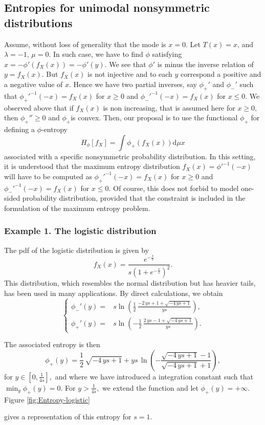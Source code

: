 \documentclass[english,onecolumn]{elsarticle}
\def\dmu{\mathrm{d}\mu}
\begin{document}
\subsection{Entropies for unimodal nonsymmetric distributions}

Assume, without loss of generality that the mode is $x=0.$ Let $T(x)=x$,
and $\lambda=-1$, $\mu=0.$ In such case, we have to find $\phi$
satisfying $x=-\phi'\left(f_{X}(x)\right)=-\phi'(y)$. We see that
$\phi'$ is minus the inverse relation of $y=f_{X}(x)$. But $f_{X}(x)$
is not injective and to each $y$ correspond a positive and a negative
value of $x.$ Hence we have two partial inverses, say $\phi_{+}'$
and $\phi_{-}'$ such that $\phi_{+}'^{-1}(-x)=f_{X}(x)$ for $x\geq0$
and $\phi_{-}'^{-1}(-x)=f_{X}(x)$ for $x\leq0$. We observed above
that if $f_{X}(x)$ is non increasing, that is assumed here for $x\geq0,$
then $\phi_{+}''\geq0$ and $\phi_{+}$is convex. Then, our proposal
is to use the functional $\phi_{+}$ for defining a $\phi$-entropy
\[
H_{\phi}[f_{X}]=\int\phi_{+}\left(f_{X}(x)\right)\dmu x
\]
associated with a specific nonsymmetric probability distribution.
In this setting, it is understood that the maximum entropy distribution
$f_{X}(x)=\phi'^{-1}(-x)$ will have to be computed as $\phi_{+}'^{-1}(-x)=f_{X}(x)$
for $x\geq0$ and $\phi_{-}'^{-1}(-x)=f_{X}(x)$ for $x\leq0$. Of
course, this does not forbid to model one-sided probability distribution,
provided that the constraint is included in the formulation of the
maximum entropy problem. 


\subsubsection{Example 1. The logistic distribution}

The pdf of the logistic distribution is given by
\[
f_{X}(x)=\frac{e^{-\frac{x}{s}}}{s\left(1+e^{-\frac{x}{s}}\right)^{2}}.
\]
This distribution, which resembles the normal distribution but has
heavier tails, has been used in many applications. By direct calculations,
we obtain 
\[
\begin{cases}
\phi_{-}'(y)= & s\ln\left(\frac{1}{2}\,{\frac{-2\, ys+1+\sqrt{-4\, ys+1}}{ys}}\right),\\
\phi_{+}'(y)= & s\ln\left(-\frac{1}{2}\,{\frac{2\, ys-1+\sqrt{-4\, ys+1}}{ys}}\right).
\end{cases}
\]


The associated entropy is then 
\[
\phi_{+}(y)=\frac{1}{2}\,\sqrt{-4\, ys+1}+ys\,\ln\left(-{\frac{\sqrt{-4\, ys+1}-1}{\sqrt{-4\, ys+1}+1}}\right),
\]
for $y\in[0,\frac{1}{4s}],$ and where we have introduced a integration
constant such that $\min_{y}\phi_{+}(y)=0.$ For $y>\frac{1}{4s},$
we extend the function and let $\phi_{+}(y)=+\infty.$ Figure \ref{fig:Entropy-logistic}
\begin{figure}
\end{figure}
gives a representation of this entropy for $s=1.$ 
\end{document}
